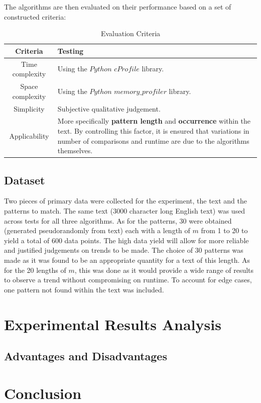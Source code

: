 \documentclass[12pt]{article}
\begin{document}
The algorithms are then evaluated on their performance based on a set of constructed criteria:

\begin{table}[!htbp]
    \centering
    \begin{tabular}{|c|p{12cm}|}
        \hline
        \textbf{Criteria} & \textbf{Testing} \\
        \hline
        Time complexity & Using the $Python$ $cProfile$ library. \\[0.25cm]
        Space complexity & Using the $Python$ $memory\_profiler$ library. \\[0.25cm]
        Simplicity & Subjective qualitative judgement. \\[0.25cm]
        Applicability & More specifically \textbf{pattern length} and \textbf{occurrence} within the text. By controlling this factor, it is ensured that variations in number of comparisons and runtime are due to the algorithms themselves. \\
        \hline
    \end{tabular}
    \caption{Evaluation Criteria}
\end{table}
\pagebreak
\subsection{Dataset}
Two pieces of primary data were collected for the experiment, the text and the patterns to match. The same text (3000 character long English text) was used across tests for all three algorithms. As for the patterns, 30 were obtained (generated pseudorandomly from text) each with a length of $m$ from 1 to 20 to yield a total of 600 data points. The high data yield will allow for more reliable and justified judgements on trends to be made. The choice of 30 patterns was made as it was found to be an appropriate quantity for a text of this length. As for the 20 lengths of $m$, this was done as it would provide a wide range of results to observe a trend without compromising on runtime. To account for edge cases, one pattern not found within the text was included.

\section{Experimental Results Analysis}
\subsection{Advantages and Disadvantages}

\section{Conclusion}

\printbibliography
\end{document}
